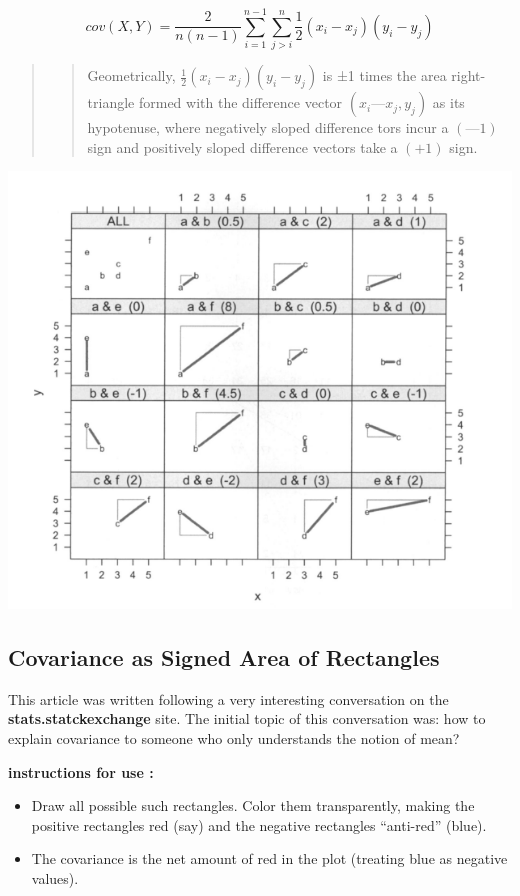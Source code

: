 \documentclass[
]{report}
\providecommand{\tightlist}{%
  \setlength{\itemsep}{0pt}\setlength{\parskip}{0pt}}
\begin{document}
\[cov(X,Y)= \frac{2}{n(n-1)}\sum_{i=1}^{n-1}\sum_{j>i}^{n}\frac{1}{2}(x_i-x_j)(y_i - y_j)\]

\begin{quote}
\begin{quote}
Geometrically, \(\frac{1}{2}(x_i-x_j)(y_i - y_j)\) is ±1 times the area right-triangle formed with the difference vector \((x_i — x_j, y_j)\) as its hypotenuse, where negatively sloped difference tors incur a \((—1)\) sign and positively sloped difference vectors take a \((+1)\) sign. \citep{Hayes}
\end{quote}
\end{quote}

\includegraphics{hayes.PNG}

\hypertarget{covariance-as-signed-area-of-rectangles}{%
\subsection{Covariance as Signed Area of Rectangles}\label{covariance-as-signed-area-of-rectangles}}

This article \citep{chudzicki} was written following a very interesting conversation on the \textbf{stats.statckexchange} site. The initial topic of this conversation was: how to explain covariance to someone who only understands the notion of mean?

\textbf{instructions for use :}

\begin{itemize}
\tightlist
\item
  Draw all possible such rectangles. Color them transparently, making the positive rectangles red (say) and the negative rectangles ``anti-red'' (blue).
\item
  The covariance is the net amount of red in the plot (treating blue as negative values).
\end{itemize}
\end{document}
